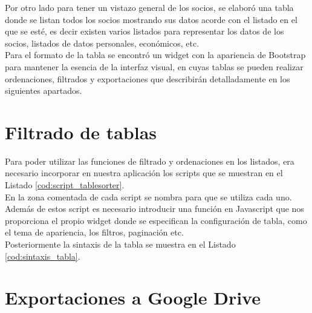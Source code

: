 



Por otro lado para tener un vistazo general de los socios, se elaboró una tabla donde se listan todos los socios mostrando sus datos acorde con el listado en el que se esté, es decir existen varios listados para representar los 
datos de los socios, listados de datos personales, económicos, etc.\\

Para el formato de la tabla se encontró un widget con la  apariencia de Bootstrap para mantener la esencia de la interfaz visual, en cuyas tablas se pueden
realizar ordenaciones, filtrados y exportaciones que describirán detalladamente en los siguientes apartados.

\section{Filtrado de tablas}
\label{4:sec8}
Para poder utilizar las funciones de filtrado y ordenaciones en los listados, era necesario incorporar en nuestra aplicación los scripts que se muestran en el Listado \ref{cod:script_tablesorter}.\\



En la zona comentada de cada script se nombra para que se utiliza cada uno. Además de estos script es necesario introducir una función en Javascript que nos  proporciona el propio widget donde se especifican la configuración de 
tabla, como el tema de apariencia, los filtros, paginación etc.\\

Posteriormente la sintaxis de la tabla se muestra en el Listado \ref{cod:sintaxis_tabla}.\\



\section{Exportaciones a Google Drive}
\label{4:sec9}

